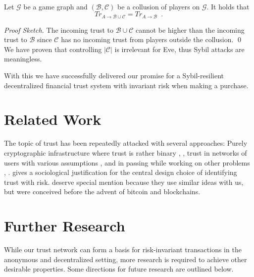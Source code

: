 \documentclass[11pt]{llncs}
\theoremstyle{definition}
\newenvironment{proofsketch}{\textit{Proof Sketch.}}{\qed \smallskip \ \\}
\begin{document}
    \begin{theorem} \ \\
       \label{sybil}
       Let $\mathcal{G}$ be a game graph and $\left(\mathcal{B}, \mathcal{C}\right)$ be a collusion of players on
       $\mathcal{G}$. It holds that
       \begin{equation*}
          Tr_{A \rightarrow \mathcal{B} \cup \mathcal{C}} = Tr_{A \rightarrow \mathcal{B}} \enspace.
       \end{equation*}
    \end{theorem}
    \begin{proofsketch}
       The incoming trust to $\mathcal{B} \cup \mathcal{C}$ cannot be higher than the incoming trust to $\mathcal{B}$ since
       $\mathcal{C}$ has no incoming trust from players outside the collusion.
    \end{proofsketch}
    We have proven that controlling $|\mathcal{C}|$ is irrelevant for Eve, thus Sybil attacks are meaningless.

    With this we have successfully delivered our promise for a Sybil-resilient decentralized financial trust system with
    invariant risk when making a purchase.

  \section{Related Work}
     The topic of trust has been repeatedly attacked with several approaches: Purely cryptographic infrastructure where trust
     is rather binary \cite{pgp,pki}, \cite{byzantine}, trust in networks of users with various assumptions
     \cite{openrep,mui,fire,beta,core}, \cite{ghkkw,pace,rk,vpc,sdt,bazaar,wot,dionyziz,pathfinder} and in passing while
     working on other problems \cite{bitcoin}, \cite{beaver,synereo}. \cite{kmrs} gives a sociological justification for the
     central design choice of identifying trust with risk. \cite{davis,iou} deserve special mention because they use similar
     ideas with us, but were conceived before the advent of bitcoin and blockchains.

  \section{Further Research}
     While our trust network can form a basis for risk-invariant transactions in the anonymous and decentralized setting,
     more research is required to achieve other desirable properties. Some directions for future research are outlined below.
\end{document}
